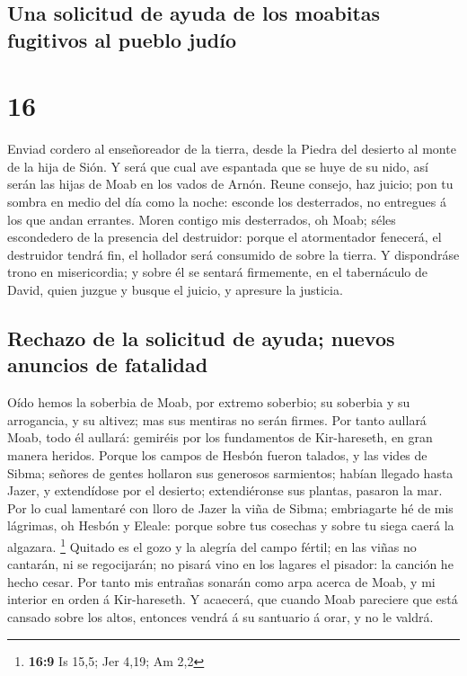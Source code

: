 \hypertarget{una-solicitud-de-ayuda-de-los-moabitas-fugitivos-al-pueblo-juduxedo}{%
\subsection{Una solicitud de ayuda de los moabitas fugitivos al pueblo
judío}\label{una-solicitud-de-ayuda-de-los-moabitas-fugitivos-al-pueblo-juduxedo}}

\hypertarget{section-15}{%
\section{16}\label{section-15}}

 Enviad cordero al enseñoreador de la tierra, desde la
Piedra del desierto al monte de la hija de Sión.  Y será
que cual ave espantada que se huye de su nido, así serán las hijas de
Moab en los vados de Arnón.  Reune consejo, haz juicio;
pon tu sombra en medio del día como la noche: esconde los desterrados,
no entregues á los que andan errantes.  Moren contigo mis
desterrados, oh Moab; séles escondedero de la presencia del destruidor:
porque el atormentador fenecerá, el destruidor tendrá fin, el hollador
será consumido de sobre la tierra.  Y dispondráse trono en
misericordia; y sobre él se sentará firmemente, en el tabernáculo de
David, quien juzgue y busque el juicio, y apresure la justicia.

\hypertarget{rechazo-de-la-solicitud-de-ayuda-nuevos-anuncios-de-fatalidad}{%
\subsection{Rechazo de la solicitud de ayuda; nuevos anuncios de
fatalidad}\label{rechazo-de-la-solicitud-de-ayuda-nuevos-anuncios-de-fatalidad}}

 Oído hemos la soberbia de Moab, por extremo soberbio; su
soberbia y su arrogancia, y su altivez; mas sus mentiras no serán
firmes.  Por tanto aullará Moab, todo él aullará: gemiréis
por los fundamentos de Kir-hareseth, en gran manera heridos.
 Porque los campos de Hesbón fueron talados, y las vides
de Sibma; señores de gentes hollaron sus generosos sarmientos; habían
llegado hasta Jazer, y extendídose por el desierto; extendiéronse sus
plantas, pasaron la mar.  Por lo cual lamentaré con lloro
de Jazer la viña de Sibma; embriagarte hé de mis lágrimas, oh Hesbón y
Eleale: porque sobre tus cosechas y sobre tu siega caerá la algazara.
\footnote{\textbf{16:9} Is 15,5; Jer 4,19; Am 2,2} 
Quitado es el gozo y la alegría del campo fértil; en las viñas no
cantarán, ni se regocijarán; no pisará vino en los lagares el pisador:
la canción he hecho cesar.  Por tanto mis entrañas
sonarán como arpa acerca de Moab, y mi interior en orden á Kir-hareseth.
 Y acaecerá, que cuando Moab pareciere que está cansado
sobre los altos, entonces vendrá á su santuario á orar, y no le valdrá.

